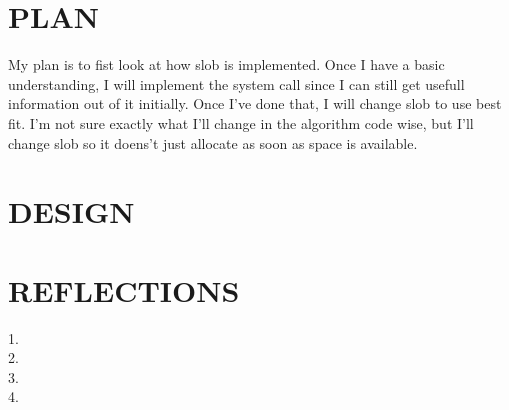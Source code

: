 \documentclass[letterpaper,10pt,titlepage]{article}
\begin{document}
\section{PLAN}
    My plan is to fist look at how slob is implemented. Once I have a basic understanding, I will implement the system call since I can still get usefull information out of it initially. Once I've done that, I will change slob to use best fit. I'm not sure exactly what I'll change in the algorithm code wise, but I'll change slob so it doens't just allocate as soon as space is available.   
 
\section{DESIGN}

\section{REFLECTIONS}
    1. \\
    2. \\
    3. \\
    4. \\ 


\end{document}
